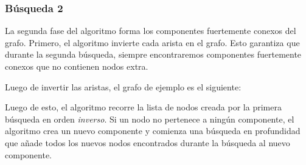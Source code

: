 \subsubsection{Búsqueda 2}

La segunda fase del algoritmo forma los componentes fuertemente conexos
del grafo. Primero, el algoritmo invierte cada arista en el grafo. Esto
garantiza que durante la segunda búsqueda, siempre encontraremos
componentes fuertemente conexos que no contienen nodos extra.

Luego de invertir las aristas, el grafo de ejemplo es el siguiente:
\begin{center}
\end{center}
Luego de esto, el algoritmo recorre la lista de nodos creada por la
primera búsqueda en orden \emph{inverso}. Si un nodo no pertenece a
ningún componente, el algoritmo crea un nuevo componente y comienza
una búsqueda en profundidad que añade todos los nuevos nodos
encontrados durante la búsqueda al nuevo componente.

